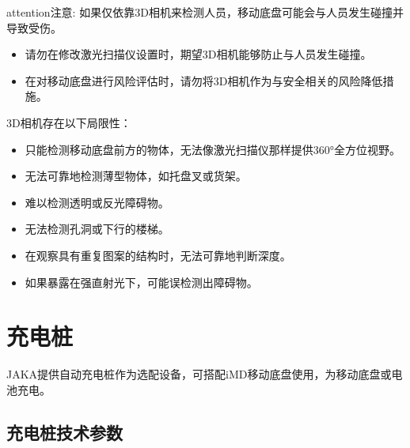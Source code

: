 \documentclass[a4paper,11pt,english,openany,oneside]{sphinxmanual}
\begin{document}
\begin{sphinxadmonition}{attention}{注意:}
\sphinxAtStartPar
如果仅依靠3D相机来检测人员，移动底盘可能会与人员发生碰撞并导致受伤。
\begin{itemize}
\item {} 
\sphinxAtStartPar
请勿在修改激光扫描仪设置时，期望3D相机能够防止与人员发生碰撞。

\item {} 
\sphinxAtStartPar
在对移动底盘进行风险评估时，请勿将3D相机作为与安全相关的风险降低措施。

\end{itemize}
\end{sphinxadmonition}

\sphinxAtStartPar
3D相机存在以下局限性：
\begin{itemize}
\item {} 
\sphinxAtStartPar
只能检测移动底盘前方的物体，无法像激光扫描仪那样提供360°全方位视野。

\item {} 
\sphinxAtStartPar
无法可靠地检测薄型物体，如托盘叉或货架。

\item {} 
\sphinxAtStartPar
难以检测透明或反光障碍物。

\item {} 
\sphinxAtStartPar
无法检测孔洞或下行的楼梯。

\item {} 
\sphinxAtStartPar
在观察具有重复图案的结构时，无法可靠地判断深度。

\item {} 
\sphinxAtStartPar
如果暴露在强直射光下，可能误检测出障碍物。

\end{itemize}


\section{充电桩}
\label{\detokenize{_u9009_u914d_u8bbe_u5907:id4}}\label{\detokenize{_u9009_u914d_u8bbe_u5907:id5}}
\sphinxAtStartPar
JAKA提供自动充电桩作为选配设备，可搭配iM\sphinxhyphen{}D移动底盘使用，为移动底盘或电池充电。


\subsection{充电桩技术参数}
\label{\detokenize{_u9009_u914d_u8bbe_u5907:id6}}\label{\detokenize{_u9009_u914d_u8bbe_u5907:id7}}
\end{document}
